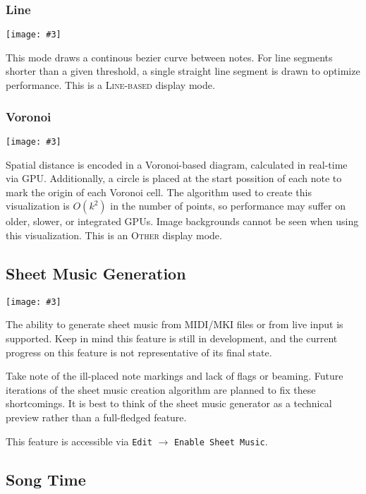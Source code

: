 \documentclass[english]{article}
\makeatletter
\newenvironment{restoretext}%
    {\@parboxrestore%
     \begin{adjustwidth}{}{\leftmargin}%
    }{\end{adjustwidth}
     }
\def\rcbegin{\begin{restoretext}\centering}
\def\rcend{\end{restoretext}}
\newcommand{\rcgnc}[3][]{
  \rcbegin
    \texttt{[image: \#3]}
  \rcend
  \vspace{1em}
}
\providecommand{\mi}[1]{\texttt{#1}}
\makeatother
\begin{document}
\newpage

\subsubsection{Line}

\rcgnc{0.86}{image/line.png}

This mode draws a continous bezier curve between notes. For line segments shorter than a given threshold,
a single straight line segment is drawn to optimize performance.
This is a \textsc{Line-based} display mode.


\subsubsection{Voronoi}

\rcgnc{0.86}{image/voronoi.png}

Spatial distance is encoded in a Voronoi-based diagram, calculated in real-time via GPU. Additionally, a circle
is placed at the start possition of each note to mark the origin of each Voronoi cell. The algorithm used to 
create this visualization is $O(k^2)$ in the number of points, so performance may suffer on older, slower, or 
integrated GPUs. Image backgrounds cannot be seen when using this visualization.
This is an \textsc{Other} display mode.

\newpage

\subsection{Sheet Music Generation}

\rcgnc{1.0}{image/sheet.png}

The ability to generate sheet music from MIDI/MKI files or from live input is supported.
Keep in mind this feature is still in development, and the current progress on this feature
is not representative of its final state.

Take note of the ill-placed note markings and lack of flags or beaming. Future iterations of the
sheet music creation algorithm are planned to fix these shortcomings. It is best to think of the
sheet music generator as a technical preview rather than a full-fledged feature.

This feature is accessible via \mi{Edit} $\rightarrow$ \mi{Enable Sheet Music}.

\subsection{Song Time}
\end{document}
